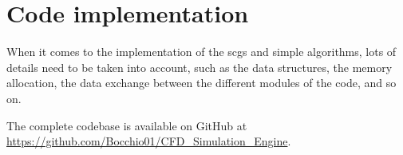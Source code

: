 \section{Code implementation}
\label{sec:code_implementation}

When it comes to the implementation of the \acrshort{scgs} and \acrshort{simple} algorithms, lots of details need to be taken into account, such as the data structures, the memory allocation, the data exchange between the different modules of the code, and so on.


The complete codebase is available on GitHub at \url{https://github.com/Bocchio01/CFD_Simulation_Engine}.





